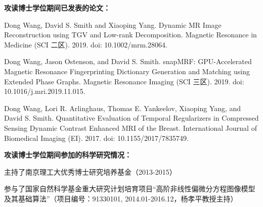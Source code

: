 \begin{publications}{99}
%
%


\item[] {\songti{}\bf{攻读博士学位期间已发表的论文：}}
\item Dong Wang, David S. Smith and Xiaoping Yang. Dynamic MR Image Reconstruction using TGV and Low-rank Decomposition. Magnetic Resonance in Medicine (SCI 二区). 2019. doi: 10.1002/mrm.28064.
\item Dong Wang, Jason Ostenson, and David S. Smith. snapMRF: GPU-Accelerated Magnetic Resonance Fingerprinting Dictionary Generation and Matching using Extended Phase Graphs. Magnetic Resonance Imaging (SCI 三区). 2019. doi: 10.1016/j.mri.2019.11.015.
\item Dong Wang, Lori R. Arlinghaus, Thomas E. Yankeelov, Xiaoping Yang, and David S. Smith. Quantitative Evaluation of Temporal Regularizers in Compressed Sensing Dynamic Contrast Enhanced MRI of the Breast. International Journal of Biomedical Imaging (EI). 2017. doi: 10.1155/2017/7835749.

\vspace{1.0cm}
\item[] {\songti{}\bf{攻读博士学位期间参加的科学研究情况：}}
\setcounter{enumiv}{0}
\item \texttt{}主持了南京理工大优秀博士研究培养基金（2013-2015）
\item \texttt{}参与了国家自然科学基金重大研究计划培育项目“高阶非线性偏微分方程图像模型及其基础算法”（项目编号：91330101, 2014.01-2016.12，杨孝平教授主持）


\end{publications}
